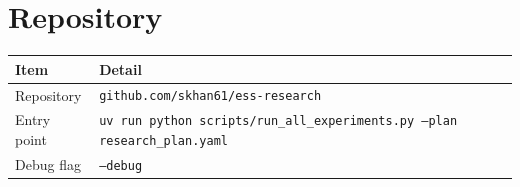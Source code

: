 \documentclass[11pt, a4paper]{article}
\begin{document}
\section{Repository}

\begin{center}
\begin{tabular}{ll}
\toprule
\textbf{Item} & \textbf{Detail} \\
\midrule
Repository   & \texttt{github.com/skhan61/ess-research} \\
Entry point  & \texttt{uv run python scripts/run\_all\_experiments.py --plan research\_plan.yaml} \\
Debug flag   & \texttt{--debug} \\
\bottomrule
\end{tabular}
\end{center}

\nocite{qin2020uw,hfrfnet2025,ravi2024sam2,yue2024surgicalsam,wu2024pointtracking,liu2024surgsam2}


\end{document}
